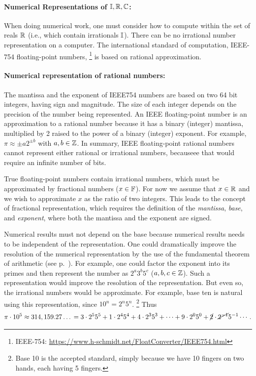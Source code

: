 \documentclass{ximera}
\begin{document}
\paragraph{Numerical Representations of $\mathbb{I}, \mathbb{R}, \mathbb{C}$:}
When doing numerical work, one must consider how to compute within the set of reals $\mathbb{R}$ (i.e., which contain irrationals $\mathbb{I}$). 
There can be no irrational number representation on a computer.
The international standard of computation, IEEE-754 floating-point numbers,%
 \footnote{IEEE-754: \url{https://www.h-schmidt.net/FloatConverter/IEEE754.html}}
is based on rational approximation. 

\paragraph{Numerical representation of rational numbers:}
The mantissa and the exponent of IEEE754 numbers are based on two 64 bit integers, having sign and magnitude.
The size of each integer depends on the precision of the number being represented. 
An IEEE floating-point number is an approximation to a rational number because it has a binary (integer) mantissa, multiplied by 2 raised to
the power of a binary (integer) exponent.
{\magenta For example, $\pi \approx \pm a 2^{\pm b}$ with $a,b\in\mathbb{Z}$.
In summary, IEEE floating-point rational numbers cannot represent either rational or irrational
numbers, becauseee that would require an infinite number of bits.
 }

True floating-point numbers contain irrational numbers, which must be approximated by fractional numbers ($x\in\mathbb{F}$). 
For now we assume that $\boldmath{x}\in\mathbb{R}$ and we wish to approximate $x$ as the ratio of two integers.
This leads to the concept of fractional representation, which requires the definition of the
\emph{mantissa}, \emph{base}, and \emph{exponent}, where both the mantissa and the exponent are signed.

Numerical results must not depend on the base because numerical results needs to be independent of the representation.
One could dramatically improve the resolution of the numerical representation by the use of the fundamental theorem of arithmetic (see p.~\pageref{FT:AR}). 
For example, one could factor the exponent into its
primes and then represent the number as $2^a 3^b 5^c$ ($a, b, c \in \mathbb{Z}$).
Such a representation would improve the resolution of the representation. But even so, the irrational
numbers would be approximate.
For example, base ten is natural using this representation, since $10^n = 2^n 5^n$.%
 \footnote{Base 10 is the accepted standard, simply because we have 10 fingers on two hands, each having 5 fingers.}  
Thus
\[
\pi \cdot 10^5 \approx 314, 159.27\ldots\, = 3\cdot 2^5 5^5 + 1\cdot 2^4 5^4 + 4\cdot2^3 5^3 + \cdots +
9\cdot 2^0 5^0 + \cancel{2}\cdot \cancel{2^{-1}} 5^{-1} \cdots.
\]
\end{document}
